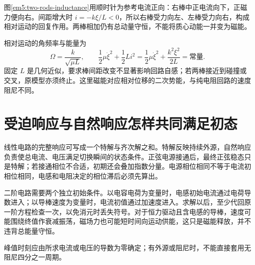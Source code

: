 图\ref{em5:two-rods-inductance}用顺时针为参考电流正向：右棒中正电流向下，正磁力便向右。间距增大时 $i=-k\xi/L<0$，所以右棒受力向左、左棒受力向右，构成相对运动的回复作用。两棒相加仍有总动量守恒，不能将质心动能一并变为磁能。

相对运动的角频率与能量为
\[\Omega=\frac{k}{\sqrt{\mu L}},\qquad
\frac12\mu\dot\xi^2+\frac12Li^2
=\frac12\mu\dot\xi^2+\frac{k^2\xi^2}{2L}=\text{常量}.\]
固定 $L$ 是几何近似，要求棒间距改变不显著影响回路自感；若两棒接近到碰撞或交叉，原模型亦须终止。这里磁能对应相对位移的二次势能，与纯电阻回路的速度阻尼不同。


\section{受迫响应与自然响应怎样共同满足初态}

线性电路的完整响应可写成一个特解与齐次解之和。特解反映持续外源，自然响应负责使总电流、电压满足切换瞬间的状态条件。正弦电源接通后，最终正弦稳态只是特解；若接通相位不合适，初期还会叠加指数分量。电源相位相同不等于电流初相位相同，电感和电阻决定的相位滞后必须先算出。

二阶电路需要两个独立初始条件。以电容电荷为变量时，电感初始电流通过电荷导数进入；以导棒速度为变量时，电流初值通过加速度进入。求解以后，至少代回原一阶方程检查一次，以免消元时丢失符号。对于恒力驱动且含电感的导棒，速度可能围绕终值作衰减振荡，磁场力也可能短时间向运动供能，这只是磁能释放，并不违背总能量守恒。

峰值时刻应由所求电流或电压的导数为零确定；有外源或阻尼时，不能直接套用无阻尼四分之一周期。

